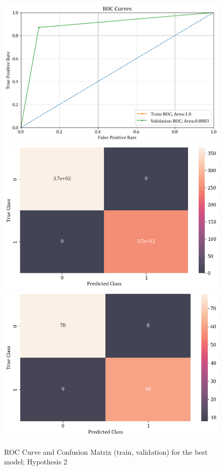 \documentclass[11pt,a4paper]{article}
\begin{document}
\begin{figure}[H]
	\centering
	\includegraphics[scale=0.26]{images/H2_roc_corve.png}
	\includegraphics[scale=0.26]{images/H2_confusion_matrix.png}
	\includegraphics[scale=0.26]{images/H2_confusion_matrix_val_test.png}
	\caption{ROC Curve and Confusion Matrix (train, validation) for the best model; Hypothesis 2}
	\label{fig:H2_roc_conf}
\end{figure}
\end{document}
